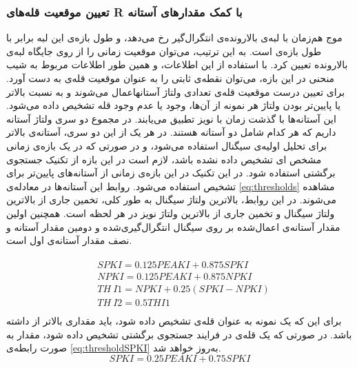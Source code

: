 \subsubsection{تعیین موقعیت قله‌های R با کمک مقدارهای آستانه}

موج  هم‌زمان با لبه‌ی بالارونده‌ی انتگرال‌گیر رخ می‌دهد، و طول بازه‌ی این لبه برابر با طول بازه‌ی  است. به این ترتیب، می‌توان موقعیت زمانی  را از روی جایگاه لبه‌ی بالارونده تعیین کرد. با استفاده از این اطلاعات، و همین طور اطلاعات مربوط به شیب منحنی  در این بازه، می‌توان نقطه‌ی ثابتی را به عنوان موقعیت قله‌ی  به دست آورد.
برای تعیین درست موقعیت قله‌ی  تعدادی ولتاژ آستانهاعمال می‌شوند و به نسبت بالاتر یا پایین‌تر بودن ولتاژ هر نمونه از آن‌ها، وجود یا عدم وجود قله تشخیص داده می‌شود. این آستانه‌ها با گذشت زمان با نویز تطبیق می‌یابند. در مجموع دو سری ولتاژ آستانه داریم که هر کدام شامل دو آستانه هستند. در هر یک از این دو سری، آستانه‌ی بالاتر برای تحلیل اولیه‌ی سیگنال استفاده می‌شود، و در صورتی که در یک بازه‌ی زمانی مشخص  ای تشخیص داده نشده باشد، لازم است در این بازه از تکنیک جستجوی برگشتی استفاده شود. در این تکنیک در این بازه‌ی زمانی  از آستانه‌های پایین‌تر برای تشخیص  استفاده می‌شود. روابط این آستانه‌ها در معادله‌ی \ref{eq:thresholds} مشاهده می‌شوند. در این روابط،  بالاترین ولتاژ سیگنال به طور کلی،  تخمین جاری از بالاترین ولتاژ سیگنال و  تخمین جاری از بالاترین ولتاژ نویز در هر لحظه است. همچنین   اولین مقدار آستانه‌ی اعمال‌شده بر روی سیگنال انتگرال‌گیری‌شده و  دومین مقدار آستانه و نصف مقدار آستانه‌ی اول است.

\begin{align}
\begin{split}
	& SPKI = 0.125 PEAKI + 0.875 SPKI\\
	& NPKI = 0.125 PEAKI + 0.875 NPKI\\
	& TH\: I1 = NPKI + 0.25(SPKI - NPKI)\\
	& TH\:I2 = 0.5 TH I1\\
\end{split}
\label{eq:thresholds}
\end{align}
برای این که یک نمونه به عنوان قله‌ی  تشخیص داده شود، باید مقداری بالاتر از  داشته باشد. در صورتی که یک قله‌ی  در فرایند جستجوی برگشتی تشخیص داده شود، مقدار  به صورت رابطه‌ی \ref{eq:thresholdSPKI} به‌روز خواهد شد. 
\begin{equation}
	SPKI = 0.25 PEAKI + 0.75 SPKI
\label{eq:thresholdSPKI}
\end{equation}

